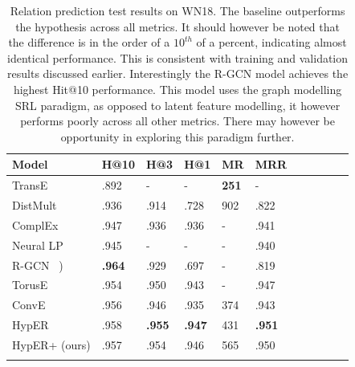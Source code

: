 
\begin{table}[H]
		\centering
		\begin{tabular}{lllllllllll}
  			\textbf{Model} & \textbf{H@10} & \textbf{H@3} & \textbf{H@1} & \textbf{MR} & \textbf{MRR} \\
  			\hline
  			TransE \unskip~\citep{bordes2013translating} & .892 & - & - & \textbf{251} & - \\
  			DistMult \unskip~\citep{yang2014embedding} & .936 & .914 & .728 & 902 & .822 \\
  			ComplEx \unskip~\citep{trouillon2016complex} & .947 & .936 & .936 & - & .941 \\
  			Neural LP \unskip~\citep{yang2017differentiable} & .945 & - & - & - & .940 \\
			R-GCN \unskip~\citep{schlichtkrull2018modeling}) & \textbf{.964} & .929 & .697 & - & .819 \\
			TorusE \unskip~\citep{ebisu2018toruse} & .954 & .950 & .943 & - & .947 \\
			ConvE \unskip~\citep{dettmers2018convolutional} & .956 & .946 & .935 & 374 & .943 \\
			HypER \unskip~\citep{balazevic2019hypernetwork} & .958 & \textbf{.955} & \textbf{.947} & 431 & \textbf{.951} \\
  			\hline
  			HypER+ (ours) & .957 & .954 & .946 & 565 & .950 \\
			&
		\end{tabular}
		\captionsetup{justification=centering}
		\caption{Relation prediction test results on WN18. The baseline outperforms the hypothesis across all metrics. It should however be noted that the difference is in the order of a $ 10^{th} $ of a percent, indicating almost identical performance. This is consistent with training and validation results discussed earlier. Interestingly the R-GCN model achieves the highest Hit@10 performance. This model uses the graph modelling SRL paradigm, as opposed to latent feature modelling, it however performs poorly across all other metrics. There may however be opportunity in exploring this paradigm further. }
\end{table}

